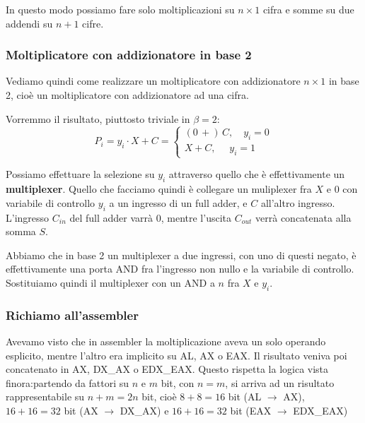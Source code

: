 \documentclass[a4paper,11pt]{article}
\begin{document}
In questo modo possiamo fare solo moltiplicazioni su $n \times 1$ cifra e somme su due addendi su $n+1$ cifre.

\subsubsection{Moltiplicatore con addizionatore in base 2}
Vediamo quindi come realizzare un moltiplicatore con addizionatore $n \times 1$ in base 2, cioè un moltiplicatore con addizionatore ad una cifra.

Vorremmo il risultato, piuttosto triviale in $\beta = 2$:
$$
P_i = y_i \cdot X + C =
	\begin{cases}
		(0 \, +) \, C, \quad y_i = 0 \\ 
		X + C, \quad \, \, y_i = 1
	\end{cases}
$$

Possiamo effettuare la selezione su $y_i$ attraverso quello che è effettivamente un \textbf{multiplexer}.
Quello che facciamo quindi è collegare un muliplexer fra $X$ e $0$ con variabile di controllo $y_i$ a un ingresso di un full adder, e $C$ all'altro ingresso.
L'ingresso $C_{in}$ del full adder varrà 0, mentre l'uscita $C_{out}$ verrà concatenata alla somma $S$.

Abbiamo che in base 2 un multiplexer a due ingressi, con uno di questi negato, è effettivamente una porta AND fra l'ingresso non nullo e la variabile di controllo.
Sostituiamo quindi il multiplexer con un AND a $n$ fra $X$ e $y_i$.

\subsubsection{Richiamo all'assembler}
Avevamo visto che in assembler la moltiplicazione aveva un solo operando esplicito, mentre l'altro era implicito su AL, AX o EAX.
Il risultato veniva poi concatenato in AX, DX\_AX o EDX\_EAX.
Questo rispetta la logica vista finora:partendo da fattori su $n$ e $m$ bit, con $n = m$, si arriva ad un risultato rappresentabile su $n + m = 2n$ bit, cioè $8 + 8 = 16$ bit (AL $\rightarrow$ AX), $16 + 16 = 32$ bit (AX $\rightarrow$ DX\_AX) e $16 + 16 = 32$ bit (EAX $\rightarrow$ EDX\_EAX)
\end{document}

